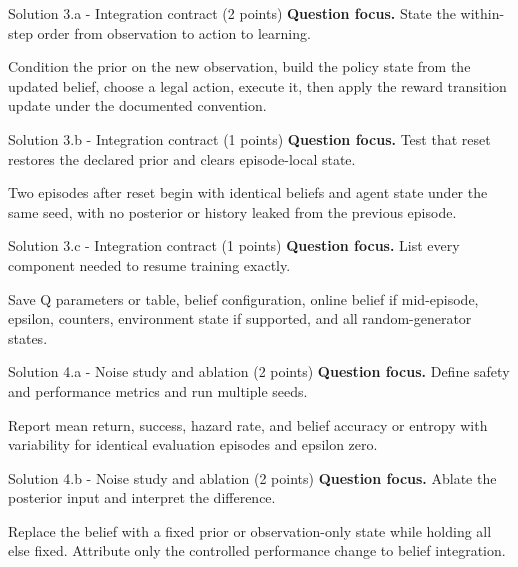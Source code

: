 \documentclass[aspectratio=169,11pt]{beamer}
\begin{document}
\begin{frame}{Solution 3.a - Integration contract (2 points)}
\small
\textbf{Question focus.} State the within-step order from observation to action to learning.

\vspace{0.25cm}
\answerlabel Condition the prior on the new observation, build the policy state from the updated belief, choose a legal action, execute it, then apply the reward transition update under the documented convention.
\end{frame}

\begin{frame}{Solution 3.b - Integration contract (1 points)}
\small
\textbf{Question focus.} Test that reset restores the declared prior and clears episode-local state.

\vspace{0.25cm}
\answerlabel Two episodes after reset begin with identical beliefs and agent state under the same seed, with no posterior or history leaked from the previous episode.
\end{frame}

\begin{frame}{Solution 3.c - Integration contract (1 points)}
\small
\textbf{Question focus.} List every component needed to resume training exactly.

\vspace{0.25cm}
\answerlabel Save Q parameters or table, belief configuration, online belief if mid-episode, epsilon, counters, environment state if supported, and all random-generator states.
\end{frame}

\begin{frame}{Solution 4.a - Noise study and ablation (2 points)}
\small
\textbf{Question focus.} Define safety and performance metrics and run multiple seeds.

\vspace{0.25cm}
\answerlabel Report mean return, success, hazard rate, and belief accuracy or entropy with variability for identical evaluation episodes and epsilon zero.
\end{frame}

\begin{frame}{Solution 4.b - Noise study and ablation (2 points)}
\small
\textbf{Question focus.} Ablate the posterior input and interpret the difference.

\vspace{0.25cm}
\answerlabel Replace the belief with a fixed prior or observation-only state while holding all else fixed. Attribute only the controlled performance change to belief integration.
\end{frame}
\end{document}
